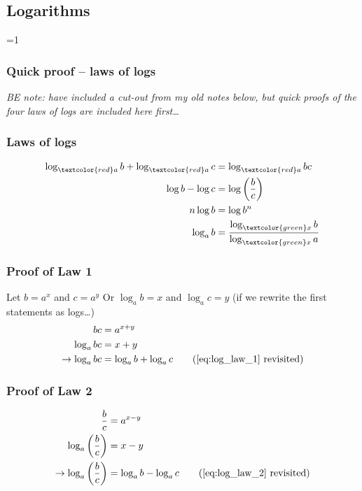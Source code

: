 \subsection{Logarithms}

\ifnum \value{printWorkedSols}=1 

	\subsubsection{Quick proof {--} laws of logs}

	\textit{%
		BE note: have included a cut-out from my old notes below,
		but quick proofs of the four laws of logs are included here first\dots
	}
	\subsubsection*{Laws of logs}
	\begin{align}
		\log_{\textcolor{red}a}{b} + \log_{\textcolor{red}a}{c} 
			&= \log_{\textcolor{red}a}{bc} 
			\label{eq:log_law_1}
			\\
		\log{b} - \log{c} 
			&= \log{\left( \frac{b}{c} \right)} 
			\label{eq:log_law_2}
			\\
		n \log{b}
			&= \log{b^{n}} 
			\label{eq:log_law_3}
			\\
		\log_{a}{b}
			&= \frac{\log_{\textcolor{green}x}{b}}{\log_{\textcolor{green}x}{a}}
			\label{eq:log_law_4}
	\end{align}
	\subsubsection*{Proof of Law 1}
	Let $b=a^{x}$ and $c=a^{y}$
	\newline
	Or $\log_{a}{b} = x$ and $\log_{a}{c} = y$
	(if we rewrite the first statements as logs\dots)
	\begin{align*}
		bc 
			&= a^{x+y}
			\\
		\log_{a}{bc} 
			&= x + y
			\\
		\rightarrow
		\log_{a}{bc} 
			&= \log_{a}{b} + \log_{a}{c}
			\tag{\ref{eq:log_law_1} revisited}
	\end{align*}
	\subsubsection*{Proof of Law 2}
	\begin{align*}
		\frac{b}{c} 
			&= a^{x-y}
			\\
		\log_{a}{\left( \frac{b}{c} \right)} 
			&= x - y
			\\
		\rightarrow
		\log_{a}{\left( \frac{b}{c} \right)}
			&= \log_{a}{b} - \log_{a}{c}
			\tag{\ref{eq:log_law_2} revisited}
	\end{align*}
